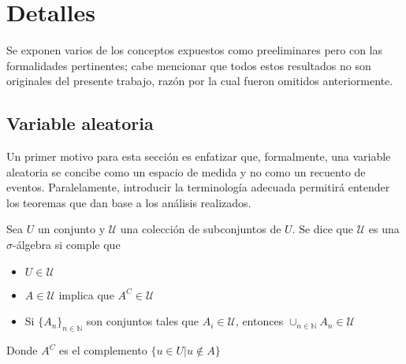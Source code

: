 \chapter{Detalles}

Se exponen varios de los conceptos expuestos como preeliminares pero con las formalidades
pertinentes; cabe mencionar que todos estos resultados no son originales del presente trabajo,
razón por la cual fueron omitidos anteriormente.


\section{Variable aleatoria}

Un primer motivo para esta sección es enfatizar que, formalmente, una variable aleatoria se concibe 
como un espacio de medida y no como un recuento de eventos. 
Paralelamente, introducir la terminología adecuada permitirá entender los teoremas que dan base
a los análisis realizados.
%

\begin{defn}
Sea $U$ un conjunto y $\mathcal{U}$ una colección de subconjuntos de $U$. Se dice que $\mathcal{U}$
es una $\sigma$-álgebra si comple que
\begin{itemize}
\item $U \in \mathcal{U}$
\item $A \in \mathcal{U}$ implica que $A^{C} \in \mathcal{U}$
\item Si $\{ A_n \}_{n\in \mathbb{N}}$ son conjuntos tales que $A_i \in \mathcal{U}$, entonces
$\displaystyle \cup_{n\in \mathbb{N}} A_n \in \mathcal{U}$
\end{itemize}
Donde $A^{C}$ es el complemento $\{ u \in U | u \notin A \} $
\end{defn}

